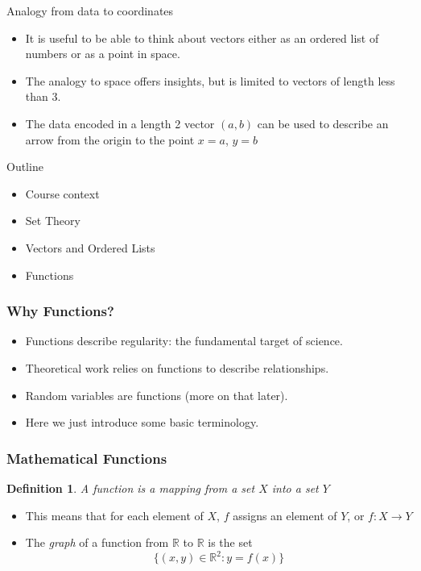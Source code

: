 \documentclass[aspectratio=169]{beamer}
\newtheorem{defn}{Definition}
\numberwithin{equation}{section}
\begin{document}
\begin{frame}{Analogy from data to coordinates}

\begin{itemize}
\item It is useful to be able to think about vectors either as an ordered list of numbers or as a point in space. 
\item The analogy to space offers insights, but is limited to vectors of length less than 3.
\item The data encoded in a length 2 vector $(a, b)$ can be used to describe an arrow from the origin to the point $x = a$, $y =b$
\end{itemize}

\end{frame}


\begin{frame}{Outline}

\begin{itemize}
\item \textcolor{mygray}{Course context}
\item \textcolor{mygray}{Set Theory}
\item \textcolor{mygray}{Vectors and Ordered Lists}
\item \textcolor{myblack}{Functions}
\end{itemize}

\end{frame}


\begin{frame}
\frametitle{Why Functions?}
\begin{itemize}
\item Functions describe regularity: the fundamental target of science.
\item Theoretical work relies on functions to describe relationships.
\item Random variables are functions (more on that later).
\item Here we just introduce some basic terminology.
\end{itemize}
\end{frame}



\begin{frame}
\frametitle{Mathematical Functions}
\begin{defn}
A \textit{function} is a mapping from a set $X$ into a set $Y$
\end{defn}
\pause

\begin{itemize}
\item This means that for each element of $X$, $f$ assigns an element of $Y$, or $f: X\rightarrow Y$ \pause
\end{itemize}

\begin{itemize}
\item The \textit{graph} of a function from $\mathbb{R} $ to $\mathbb{R}$ is the set $$\{(x, y)\in \mathbb{R}^2: y=f(x)\}$$ 
\end{itemize}
\end{frame}
\end{document}
